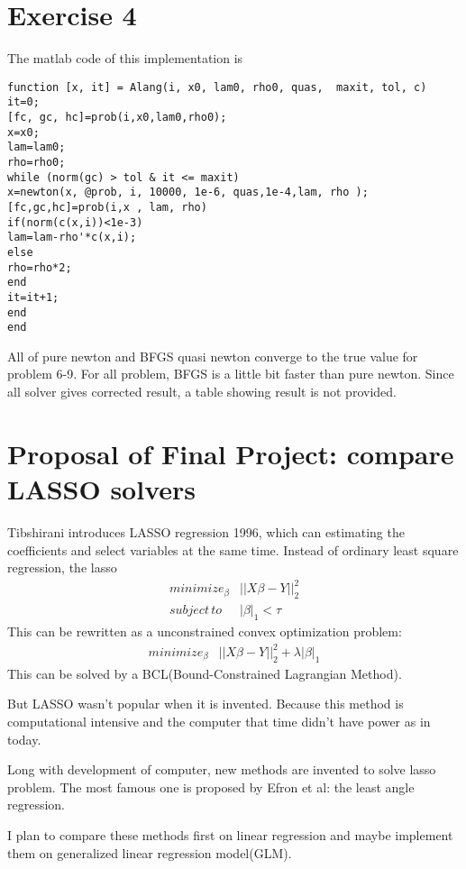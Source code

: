 \documentclass[12pt,a4paper]{article}
\begin{document}
\section*{Exercise 4}

The matlab code of this implementation is \begin{verbatim}
function [x, it] = Alang(i, x0, lam0, rho0, quas,  maxit, tol, c)
it=0;
[fc, gc, hc]=prob(i,x0,lam0,rho0);
x=x0;
lam=lam0;
rho=rho0;
while (norm(gc) > tol & it <= maxit)
x=newton(x, @prob, i, 10000, 1e-6, quas,1e-4,lam, rho );
[fc,gc,hc]=prob(i,x , lam, rho)
if(norm(c(x,i))<1e-3)
lam=lam-rho'*c(x,i);
else
rho=rho*2;
end
it=it+1;
end
end
\end{verbatim}

All of pure newton  and BFGS quasi newton converge to the true value for problem 6-9. For all problem, BFGS is a little bit faster than pure newton. Since all solver gives corrected result, a table showing result is not provided.
\newpage
\section{Proposal of Final Project: compare LASSO solvers}
Tibshirani \cite{tibshirani1996regression} introduces LASSO regression 1996, which can estimating the coefficients and select variables at the same time. Instead of ordinary least square regression, the lasso \[
\begin{array}{ll}
minimize_\beta &||X\beta-Y||_2^2\\
subject\, to & |\beta|_1<\tau
\end{array}
\]
This can be rewritten as a unconstrained convex optimization problem:
\[
\begin{array}{ll}
minimize_\beta &||X\beta-Y||_2^2+\lambda|\beta|_1
\end{array}
\]
This can be solved by a BCL(Bound-Constrained Lagrangian Method).

But LASSO wasn't popular when it is invented. Because this method is computational intensive and the computer that time didn't have power as in today. 

Long with development of computer, new methods are invented to solve lasso problem. The most famous one is proposed by Efron et al\cite{efron2004least}: the least angle regression.

I plan to compare these methods first on linear regression and maybe implement them on generalized linear regression model(GLM).
\printbibliography[title=References]
\end{document}
